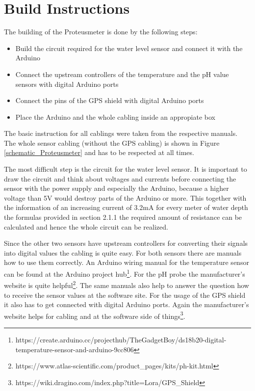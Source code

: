 \documentclass[11pt, letterpaper]{article}
\begin{document}
\section{Build Instructions}
The building of the Proteusmeter is done by the following steps:
\begin{itemize}
		\item Build the circuit required for the water level sensor and connect it with the Arduino
		\item Connect the upstream controllers of the temperature and the pH value sensors with digital Arduino ports
		\item Connect the pins of the GPS shield with digital Arduino ports
		\item Place the Arduino and the whole cabling inside an appropiate box
\end{itemize}
The basic instruction for all cablings were taken from the respective manuals. The whole sensor cabling (without the GPS cabling) is shown in Figure \ref{schematic_Proteusmeter} and has to be respected at all times.
\newline

The most difficult step is the circuit for the water level sensor. It is important to draw the circuit and think about voltages and currents before connecting the sensor with the power supply and especially the Arduino, because a higher voltage than 5V would destroy parts of the Arduino or more. This together with the information of an increasing current of 3.2mA for every meter of water depth the formulas provided in section 2.1.1 the required amount of resistance can be calculated and hence the whole circuit can be realized.
\newline

Since the other two sensors have upstream controllers for converting their signals into digital values the cabling is quite easy. For both sensors there are manuals how to use them correctly. An Arduino wiring manual for the temperature sensor can be found at the Arduino project hub\footnote{https://create.arduino.cc/projecthub/TheGadgetBoy/ds18b20-digital-temperature-sensor-and-arduino-9cc806}. For the pH probe the manufacturer's website is quite helpful\footnote{https://www.atlas-scientific.com/product\_pages/kits/ph-kit.html}. The same manuals also help to answer the question how to receive the sensor values at the software site. For the usage of the GPS shield it also has to get connected with digital Arduino ports. Again the manufacturer's website helps for cabling and at the software side of things\footnote{https://wiki.dragino.com/index.php?title=Lora/GPS\_Shield}.
\newline
\end{document}

